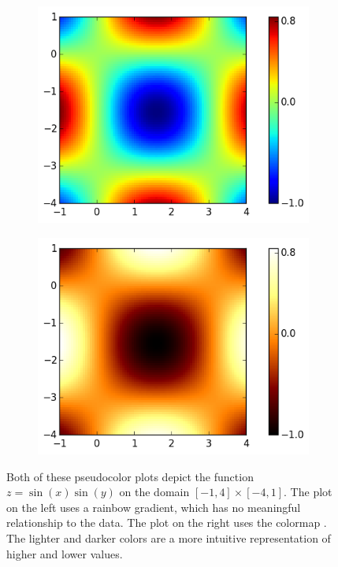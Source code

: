 \begin{figure}[h]
\centering
\begin{subfigure}{.5\textwidth}
  \centering
  \includegraphics[width=\textwidth]{heatmap_color.png}
\end{subfigure}%
\begin{subfigure}{.5\textwidth}
  \centering
  \includegraphics[width=\textwidth]{heatmap_hot.png}
\end{subfigure}
\caption{Both of these pseudocolor plots depict the function
    $z = \sin(x)\sin(y)$ on the domain $[-1,4] \times [-4,1]$.
The plot on the left uses a rainbow gradient, which has no meaningful relationship to the data.
The plot on the right uses the colormap .  The lighter and darker colors are a more intuitive
representation of higher and lower values.}

\label{fig:heatmap}
\end{figure}

